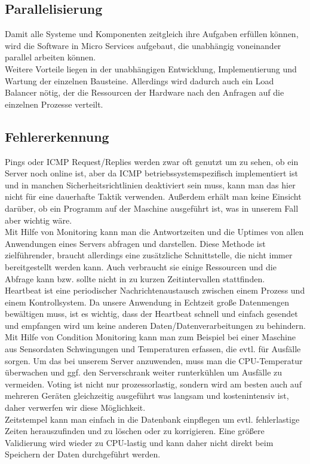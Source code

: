 \subsection{Parallelisierung}
Damit alle Systeme und Komponenten zeitgleich ihre Aufgaben erfüllen können, wird die Software in Micro Services aufgebaut, die unabhängig voneinander parallel arbeiten können.\\
Weitere Vorteile liegen in der unabhängigen Entwicklung, Implementierung und Wartung der einzelnen Bausteine. Allerdings wird dadurch auch ein Load Balancer nötig, der die Ressourcen der Hardware nach den Anfragen auf die einzelnen Prozesse verteilt. 
\subsection{Fehlererkennung}
Pings oder ICMP Request/Replies werden zwar oft genutzt um zu sehen, ob ein Server noch online ist, aber da ICMP betriebssystemspezifisch implementiert ist und in manchen Sicherheitsrichtlinien deaktiviert sein muss, kann man das hier nicht für eine dauerhafte Taktik verwenden. Außerdem erhält man keine Einsicht darüber, ob ein Programm auf der Maschine ausgeführt ist, was in unserem Fall aber wichtig wäre. 
\\
Mit Hilfe von Monitoring kann man die Antwortzeiten und die Uptimes von allen Anwendungen eines Servers abfragen und darstellen. Diese Methode ist zielführender, braucht allerdings eine zusätzliche Schnittstelle, die nicht immer bereitgestellt werden kann. Auch verbraucht sie einige Ressourcen und die Abfrage kann bzw. sollte nicht in zu kurzen Zeitintervallen stattfinden. 
\\
Heartbeat ist eine periodischer Nachrichtenaustausch zwischen einem Prozess und einem Kontrollsystem. Da unsere Anwendung in Echtzeit große Datenmengen bewältigen muss, ist es wichtig, dass der Heartbeat schnell und einfach gesendet und empfangen wird um keine anderen Daten/Datenverarbeitungen zu behindern. 
Mit Hilfe von Condition Monitoring kann man zum Beispiel bei einer Maschine aus Sensordaten Schwingungen und Temperaturen erfassen, die evtl. für Ausfälle sorgen. Um das bei unserem Server anzuwenden, muss man die CPU-Temperatur überwachen und ggf. den Serverschrank weiter runterkühlen um Ausfälle zu vermeiden. 
Voting ist nicht nur prozessorlastig, sondern wird am besten auch auf mehreren Geräten gleichzeitig ausgeführt was langsam und kostenintensiv ist, daher verwerfen wir diese Möglichkeit.
\\
Zeitstempel kann man einfach in die Datenbank einpflegen um evtl. fehlerlastige Zeiten herauszufinden und zu löschen oder zu korrigieren. Eine größere Validierung wird wieder zu CPU-lastig und kann daher nicht direkt beim Speichern der Daten durchgeführt werden.\\
